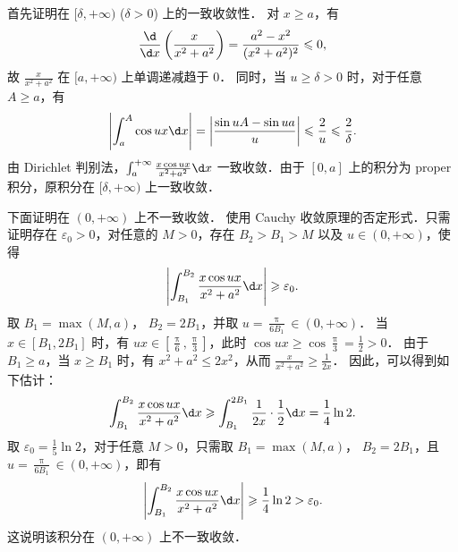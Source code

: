 \begin{myproof}
    首先证明在 $[\delta, +\infty)$ ($\delta > 0$) 上的一致收敛性．
    对 $x \geqslant a$，有
    \begin{equation}\label{eq:q7-mono-2}
        \frac{\d}{\d x} \left( \frac{x}{x^2 + a^2} \right) = \frac{a^2 - x^2}{(x^2 + a^2)^2} \leqslant 0,
    \end{equation}
    故 $\frac{x}{x^2 + a^2}$ 在 $[a, +\infty)$ 上单调递减趋于 $0$．
    同时，当 $u \geqslant \delta > 0$ 时，对于任意 $A \geqslant a$，有
    \begin{equation}\label{eq:q7-dirichlet-3}
        \left| \int_a^A \cos ux \d x \right| = \left| \frac{\sin uA - \sin ua}{u} \right| \leqslant \frac{2}{u} \leqslant \frac{2}{\delta}.
    \end{equation}
    由 Dirichlet 判别法，$\int_a^{+\infty} \frac{x \cos ux}{x^2 + a^2} \d x$ 一致收敛．由于 $[0, a]$ 上的积分为 proper 积分，原积分在 $[\delta, +\infty)$ 上一致收敛．

    下面证明在 $(0, +\infty)$ 上不一致收敛．
    使用 Cauchy 收敛原理的否定形式．只需证明存在 $\varepsilon_0 > 0$，对任意的 $M > 0$，存在 $B_2 > B_1 > M$ 以及 $u \in (0, +\infty)$，使得
    \begin{equation}\label{eq:q7-cauchy-neg-4}
        \left| \int_{B_1}^{B_2} \frac{x \cos ux}{x^2 + a^2} \d x \right| \geqslant \varepsilon_0.
    \end{equation}
    取 $B_1 = \max(M, a)$， $B_2 = 2 B_1$，并取 $u = \frac{\uppi}{6 B_1} \in (0, +\infty)$．
    当 $x \in [B_1, 2 B_1]$ 时，有 $ux \in [\frac{\uppi}{6}, \frac{\uppi}{3}]$，此时 $\cos ux \geqslant \cos \frac{\uppi}{3} = \frac{1}{2} > 0$．
    由于 $B_1 \geqslant a$，当 $x \geqslant B_1$ 时，有 $x^2 + a^2 \leqslant 2 x^2$，从而 $\frac{x}{x^2 + a^2} \geqslant \frac{1}{2x}$．
    因此，可以得到如下估计：
    \begin{equation}\label{eq:q7-estimate-5}
        \int_{B_1}^{B_2} \frac{x \cos ux}{x^2 + a^2} \d x \geqslant \int_{B_1}^{2 B_1} \frac{1}{2x} \cdot \frac{1}{2} \d x = \frac{1}{4} \ln 2.
    \end{equation}
    取 $\varepsilon_0 = \frac{1}{5} \ln 2$，对于任意 $M > 0$，只需取 $B_1 = \max(M, a)$， $B_2 = 2 B_1$，且 $u = \frac{\uppi}{6 B_1} \in (0, +\infty)$，即有
    \begin{equation}\label{eq:q7-conclusion-6}
        \left| \int_{B_1}^{B_2} \frac{x \cos ux}{x^2 + a^2} \d x \right| \geqslant \frac{1}{4} \ln 2 > \varepsilon_0.
    \end{equation}
    这说明该积分在 $(0, +\infty)$ 上不一致收敛．
\end{myproof}

